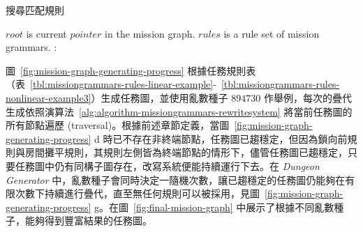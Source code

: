 \begin{algorithm}[!htb]
    \caption{搜尋匹配規則}
    \label{alg:algorithm-matchedrule}
    \begin{algorithmic}[1]
        \Require
            \Statex $root$ is current $pointer$ in the mission graph.
            \Statex $rules$ is a rule set of mission grammars.
        \Ensure
                               
                :                              
                         
                                              
                    \EndIf
                \EndFor
                                
                                      
            \EndFunction
    \end{algorithmic}
\end{algorithm}

圖~\ref{fig:mission-graph-generating-progress} 根據任務規則表（表~\ref{tbl:missiongrammars-rules-linear-example}-~\ref{tbl:missiongrammars-rules-nonlinear-example3}）生成任務圖，並使用亂數種子 $894730$ 作舉例，每次的疊代生成依照演算法~\ref{alg:algorithm-missiongrammars-rewritesystem} 將當前任務圖的所有節點遍歷 (traversal)。根據前述章節定義，當圖~\ref{fig:mission-graph-generating-progress} d 時已不存在非終端節點，任務圖已趨穩定，但因為鎖向前規則與房間攤平規則，其規則左側皆為終端節點的情形下，儘管任務圖已趨穩定，只要任務圖中仍有同構子圖存在，改寫系統便能持續運行下去。在 \textit{Dungeon Generator} 中，亂數種子會同時決定一隨機次數，讓已趨穩定的任務圖仍能夠在有限次數下持續進行疊代，直至無任何規則可以被採用，見圖~\ref{fig:mission-graph-generating-progress} g。在圖~\ref{fig:final-mission-graph} 中展示了根據不同亂數種子，能夠得到豐富結果的任務圖。

